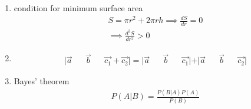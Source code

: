 \begin{enumerate}[label=\thesubsection.\arabic*, ref=\thesubsection.\theenumi]
 \item condition for minimum surface area 
 \begin{align}
     S=\pi r^2+2\pi rh \implies \frac{dS}{dr}=0 \\ \implies \frac{d^2S}{dr^2}>0 \label{eq:ee26btech11222-prob 30}
 \end{align}
 \item
 \begin{align}
     \vert{}\vec{a}&&\vec{b}&& \vec{c_1}+\vec{c_2}\vert{}=|\vec{a}&&\vec{b} &&\vec{c_1}|+|\vec{a}&&\vec{b}&&\vec{c_2}|
 \end{align}
 \item Bayes' theorem 
 \begin{align}
     P(A|B)=\frac{P(B|A)P(A)}{P(B)} \label{eq:ee26btech11222-prob 33}
 \end{align}
\end{enumerate}
